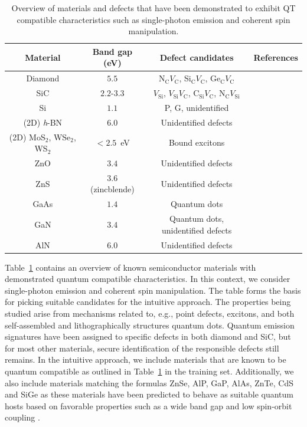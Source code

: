\documentclass[superscriptaddress,unsortedaddress,
 amsmath,amssymb,
 aps,
]{revtex4-2}
\begin{document}
\begin{table}[b]
    \centering 
    \caption{Overview of materials and defects that have been demonstrated to exhibit QT compatible characteristics such as single-photon emission and coherent spin manipulation.}
    \begin{tabular}{c|c|c|c}
    Material & Band gap (eV) & Defect candidates & References \\
    \hline
    Diamond  & $5.5$  & N$_\mathrm{C}V_\mathrm{C}$, Si$_\mathrm{C}V_\mathrm{C}$, Ge$_\mathrm{C}V_\mathrm{C}$ & \cite{Taylor2008,Balasubramanian_2009,Barclay2011,Gordon2013,Rogers_2014,Bhaskar_2018} \\ 
    SiC & $2.2$-$3.3$ & $V_\mathrm{Si}$, $V_\mathrm{Si}V_\mathrm{C}$, C$_\mathrm{Si}V_\mathrm{C}$, N$_\mathrm{C}V_\mathrm{Si}$ & \cite{Widmann2014,Christle_2015,Castelletto_2014,Zargaleh_2018}  \cite{Weber2010, Son2020, Falk2013} \\ 
    Si & $1.1$ & P, G, unidentified & \cite{Muhonen_2014,Durand_2020,Redjem2020} \\ 
    (2D) \textit{h}-BN & $6.0$ & Unidentified defects & \cite{Tran_2016,Tran_2016b,Hayee_2020} \\ 
    (2D) MoS$_2$, WSe$_2$, WS$_2$ & $<2.5$~eV & Bound excitons & \cite{Toth2019} \\
    ZnO & $3.4$ & Unidentified defects & \cite{Morfa2012} \\ 
    ZnS & $3.6$ (zincblende) & Unidentified defects & \cite{Stewart2019} \\ 
    GaAs & $1.4$ & Quantum dots & \cite{Bluhm2010} \\ 
    GaN & $3.4$ & Quantum dots, unidentified defects & \cite{Roux2017,Berhane2018} \\
    AlN & $6.0$ & Unidentified defects & \cite{Xue2020}\\
    \end{tabular}
    \label{tab:qt-materials}
\end{table} 

Table~\ref{tab:qt-materials} contains an overview of known semiconductor materials with demonstrated quantum compatible characteristics. In this context, we consider single-photon emission and coherent spin manipulation.   
The table forms the basis for picking suitable candidates for the intuitive approach. 
The properties being studied arise from mechanisms related to, e.g., point defects, excitons, and both self-assembled and lithographically structures quantum dots. 
Quantum emission signatures have been assigned to specific defects in both diamond and SiC, but for most other materials, secure identification of the responsible defects still remains. 
In the intuitive approach, we include materials that are known to be quantum compatible as outlined in Table~\ref{tab:qt-materials} in the training set. Additionally, we also include materials matching the formulas ZnSe, AlP, GaP, AlAs, ZnTe, CdS and SiGe as these materials have been predicted to behave as suitable quantum hosts based on favorable properties such as a wide band gap and low spin-orbit coupling \cite{Weber2010,Hardy2019}.  
\end{document}
